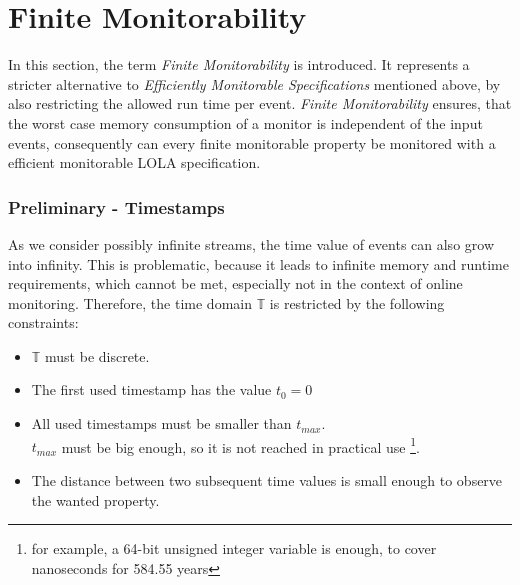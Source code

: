 \section{Finite Monitorability}
	In this section, the term \textit{Finite Monitorability} is introduced. It represents a stricter alternative to \textit{Efficiently Monitorable Specifications} mentioned above, by also restricting the allowed run time per event. \textit{Finite Monitorability} ensures, that the worst case memory consumption of a monitor is independent of the input events, consequently can every finite monitorable property be monitored with a efficient monitorable LOLA specification. 
	\subsubsection{Preliminary - Timestamps}
		\label{monitorability_timestamps}
		As we consider possibly infinite streams, the time value of events can also grow into infinity. This is problematic, because it leads to infinite memory and runtime requirements, which cannot be met, especially not in the context of online monitoring. Therefore, the time domain $\mathbb{T}$ is restricted by the following constraints:
		\begin{itemize}
			\item
				$\mathbb{T}$ must be discrete.
			\item
				The first used timestamp has the value $t_0=0$
			\item
				All used timestamps must be smaller than $t_{max}$.\\
				$t_{max}$ must be big enough, so it is not reached in practical use \footnote{for example, a 64-bit unsigned integer variable is enough, to cover nanoseconds for 584.55 years}.
			\item
				The distance between two subsequent time values is small enough to observe the wanted property.
		\end{itemize}

